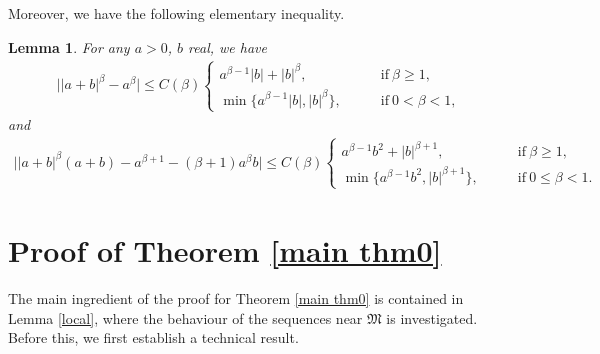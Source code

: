 \documentclass[11pt]{article}
\newtheorem{lemma}{Lemma}[section]
\begin{document}
Moreover, we have the following elementary inequality.
\begin{lemma}\cite[Lemma 2.1]{LN98}\label{gs}
For any $a>0$, $b$ real, we have
\begin{align*}
 \big||a+b|^\beta-a^\beta\big|\leq C(\beta)
 \begin{cases}
             a^{\beta-1}|b|+|b|^\beta,\qquad & \mathrm{if} ~ \beta\geq1,\\
              \min\big\{a^{\beta-1}|b|,|b|^\beta\big\},\qquad & \mathrm{if} ~ 0<\beta<1,
           \end{cases}
  \end{align*}
  and
  \begin{align*}
 \big||a+b|^\beta(a+b)-a^{\beta+1}-(\beta+1)a^\beta b\big|\leq C(\beta)
 \begin{cases}
             a^{\beta-1}b^2+|b|^{\beta+1},\qquad & \mathrm{if} ~ \beta\geq1,\\
              \min\big\{a^{\beta-1}b^2,|b|^{\beta+1}\big\},\qquad & \mathrm{if} ~ 0\leq\beta<1.
           \end{cases}
  \end{align*}
\end{lemma}

\section{Proof of Theorem \ref{main thm0}}\label{sec3}
The main ingredient of the proof for Theorem \ref{main thm0} is contained in Lemma \ref{local}, where the behaviour of the sequences near $\mathfrak{M}$ is investigated.
Before this, we first establish a technical result.
\end{document}
